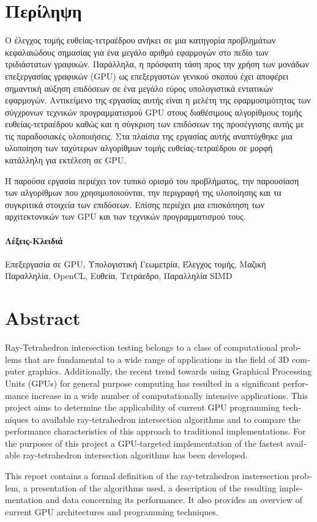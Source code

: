 \chapter*{Περίληψη}
\pagestyle{plain}

\noindent Ο έλεγχος τομής ευθείας-τετραέδρου ανήκει σε μια κατηγορία προβλημάτων κεφαλαιώδους σημασίας για ένα μεγάλο αριθμό εφαρμογών στο πεδίο  των τριδιάστατων γραφικών. Παράλληλα, η πρόσφατη τάση προς την χρήση των μονάδων επεξεργασίας γραφικών (GPU) ως επεξεργαστών γενικού σκοπού έχει αποφέρει σημαντική αύξηση επιδόσεων σε ένα μεγάλο εύρος υπολογιστικά εντατικών εφαρμογών. Αντικείμενο της εργασίας αυτής είναι η μελέτη της εφαρμοσιμότητας των σύγχρονων τεχνικών προγραμματισμού GPU στους διαθέσιμους αλγορίθμους τομής ευθείας-τετραέδρου καθώς και η σύγκριση των επιδόσεων της προσέγγισης αυτής με τις παραδοσιακές υλοποιήσεις. Στα πλαίσια της εργασίας αυτής αναπτύχθηκε μια υλοποίηση των ταχύτερων αλγορίθμων τομής ευθείας-τετραέδρου σε μορφή κατάλληλη για εκτέλεση σε GPU.

Η παρούσα εργασία περιέχει τον τυπικό ορισμό του προβλήματος, την παρουσίαση των αλγορίθμων που χρησιμοποιούνται, την περιγραφή της υλοποίησης και τα συγκριτικά στοιχεία των επιδόσεων. Επίσης περιέχει μια επισκόπηση των αρχιτεκτονικών των GPU και των τεχνικών προγραμματισμού τους.

\subsubsection*{Λέξεις-Κλειδιά}

\noindent Επεξεργασία σε GPU, Υπολογιστική Γεωμετρία, Έλεγχος τομής, Μαζική Παραλληλία, OpenCL, Ευθεία, Τετράεδρο, Παραλληλία SIMD 

\chapter*{Abstract}
\begin{english}
\noindent Ray-Tetrahedron intersection testing belongs to a class of computational problems that are fundamental to a wide range of applications in the field of 3D computer graphics. Additionally, the recent trend towards using Graphical Processing Units (GPUs) for general purpose computing has resulted in a significant performance increase in a wide number of computationally intensive applications. This project aims to determine the applicability of current GPU programming techniques to available ray-tetrahedron intersection algorithms and to compare the performance characteristics of this approach to traditional implementations. For the purposes of this project a GPU-targeted implementation of the fastest available ray-tetrahedron intersection algorithms has been developed. 

This report contains a formal definition of the ray-tetrahedron instersection problem, a presentation of the algorithms used, a description of the resulting implementation and data concerning its performance. It also provides an overview of current GPU architectures and programming techniques.
\end{english} 

